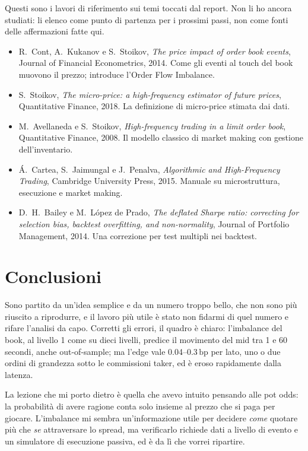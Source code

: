 \documentclass[a4paper,11pt]{article}
\newcommand{\bp}{\ensuremath{\,\mathrm{bp}}}
\begin{document}
Questi sono i lavori di riferimento sui temi toccati dal report. Non li ho ancora studiati: li
elenco come punto di partenza per i prossimi passi, non come fonti delle affermazioni fatte qui.
\begin{itemize}[leftmargin=*]
  \item R.~Cont, A.~Kukanov e S.~Stoikov, \emph{The price impact of order book events},
        Journal of Financial Econometrics, 2014. Come gli eventi al touch del book muovono il
        prezzo; introduce l'Order Flow Imbalance.
  \item S.~Stoikov, \emph{The micro-price: a high-frequency estimator of future prices},
        Quantitative Finance, 2018. La definizione di micro-price stimata dai dati.
  \item M.~Avellaneda e S.~Stoikov, \emph{High-frequency trading in a limit order book},
        Quantitative Finance, 2008. Il modello classico di market making con gestione
        dell'inventario.
  \item Á.~Cartea, S.~Jaimungal e J.~Penalva, \emph{Algorithmic and High-Frequency Trading},
        Cambridge University Press, 2015. Manuale su microstruttura, esecuzione e market
        making.
  \item D.~H.~Bailey e M.~López de Prado, \emph{The deflated Sharpe ratio: correcting for
        selection bias, backtest overfitting, and non-normality}, Journal of Portfolio
        Management, 2014. Una correzione per test multipli nei backtest.
\end{itemize}

\section{Conclusioni}
\label{sec:conclusioni}

Sono partito da un'idea semplice e da un numero troppo bello, che non sono più riuscito a
riprodurre, e il lavoro più utile è stato non fidarmi di quel numero e rifare l'analisi da capo.
Corretti gli errori, il quadro è chiaro: l'imbalance del book, al livello 1 come su dieci
livelli, predice il movimento del mid tra 1 e 60 secondi, anche out-of-sample; ma l'edge vale
0.04--0.3\bp{} per lato, uno o due ordini di grandezza sotto le commissioni taker, ed è eroso
rapidamente dalla latenza.

La lezione che mi porto dietro è quella che avevo intuito pensando alle pot odds: la probabilità
di avere ragione conta solo insieme al prezzo che si paga per giocare. L'imbalance mi sembra
un'informazione utile per decidere \emph{come} quotare più che \emph{se} attraversare lo spread,
ma verificarlo richiede dati a livello di evento e un simulatore di esecuzione passiva, ed è da
lì che vorrei ripartire.
\end{document}
